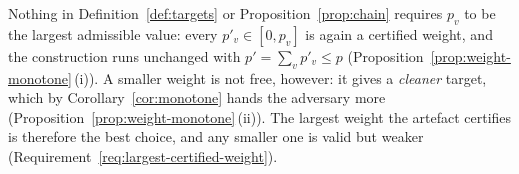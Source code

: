 
\begin{remark}
\label{rem:weightfree}
Nothing in Definition~\ref{def:targets} or Proposition~\ref{prop:chain}
requires $p_v$ to be the largest admissible value: every
$p'_v\in[0,p_v]$ is again a certified weight, and the construction runs
unchanged with $p'=\sum_vp'_v\le p$
(Proposition~\ref{prop:weight-monotone}\,(i)). A smaller weight is not free,
however: it gives a \emph{cleaner} target, which by
Corollary~\ref{cor:monotone} hands the adversary more
(Proposition~\ref{prop:weight-monotone}\,(ii)). The largest weight the
artefact certifies is therefore the best choice, and any smaller one is valid
but weaker (Requirement~\ref{req:largest-certified-weight}).
\end{remark}
